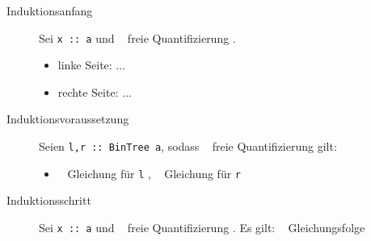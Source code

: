 \documentclass[ngerman, a4paper, 11pt]{article}
\theoremstyle{nonumberplain}
\newcommand*{\enq}[1]{\flq \ \!\!\! #1 \!\!\! \frq}
\begin{document}
\begin{description}
	\item[Induktionsanfang] Sei \texttt{x :: a} und \enq{freie Quantifizierung}.
	\begin{itemize}[nolistsep, topsep=-\parskip]
		\item linke Seite: $\dots$
		\item rechte Seite: $\dots$
	\end{itemize}
	\item[Induktionsvoraussetzung] Seien \texttt{l,r :: BinTree a}, sodass \enq{freie Quantifizierung} gilt:
	\begin{itemize}[nolistsep, topsep=-\parskip]
		\item \enq{Gleichung für \texttt{l}}, \enq{Gleichung für \texttt{r}}
	\end{itemize}
	\item[Induktionsschritt] Sei \texttt{x :: a} und \enq{freie Quantifizierung}. Es gilt: \enq{Gleichungsfolge}
\end{description}
\end{document}
